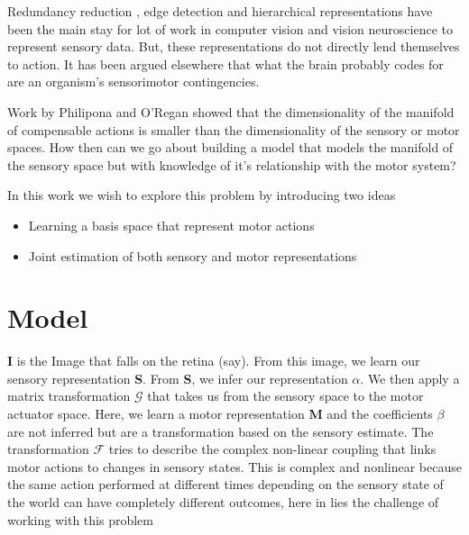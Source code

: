 \documentclass[conference]{IEEEtran}
\begin{document}
\begin{abstract}
\end{abstract}

\IEEEpeerreviewmaketitle




Redundancy reduction \cite{barlow1961possible}, edge detection \cite{hubel1968receptive}  and hierarchical representations \cite{krizhevsky2012imagenet} have been the main stay for lot of work in computer vision and vision neuroscience to represent sensory data. But, these representations do not directly lend themselves to action. It has been argued elsewhere \cite{o2001sensorimotor} that what the brain probably codes for are an organism's sensorimotor contingencies.  

Work by Philipona and O'Regan \cite{philipona2003there,philipona2003perception} showed that the dimensionality of the manifold of compensable actions is smaller than the dimensionality of the sensory or motor spaces. How then can we go about building a model that models the manifold of the sensory space but with knowledge of it's relationship with the motor system? 

In this work we wish to explore this problem by introducing two ideas 
\begin{itemize}
\item Learning a basis space that represent motor actions 
\item Joint estimation of both sensory and motor representations
\end{itemize}


\section{Model}
\textbf{I} is the Image that falls on the retina (say). From this image, we learn our sensory representation \textbf{S}. From \textbf{S}, we infer our representation \textbf{$\alpha$}. We then apply a matrix transformation $\mathcal{G}$ that takes us from the sensory space to the motor actuator space. Here, we learn a motor representation \textbf{M} and the coefficients \textbf{$\beta$} are not inferred but are a transformation based on the sensory estimate. The transformation $\mathcal{F}$ tries to describe the complex non-linear coupling that links motor actions to changes in sensory states. This is complex and nonlinear because the same action performed at different times depending on the sensory state of the world can have completely different outcomes, here in lies the challenge of working with this problem
\end{document}
